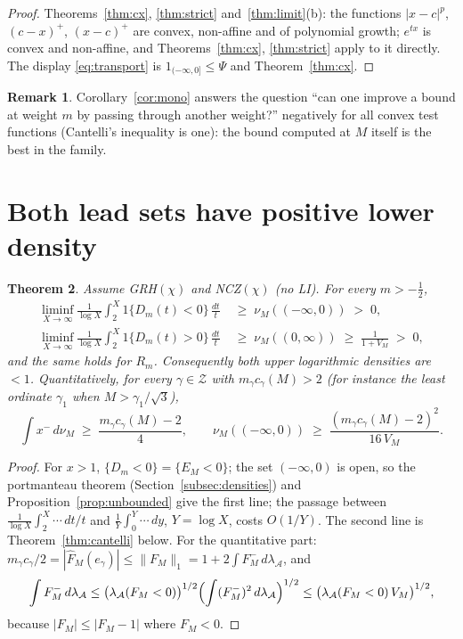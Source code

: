 \documentclass[11pt]{amsart}
\newtheorem{theorem}{Theorem}[section]
\theoremstyle{definition}
\newtheorem{remark}[theorem]{Remark}
\numberwithin{equation}{section}
\newcommand{\cA}{\mathcal A}          %
\newcommand{\cZ}{\mathcal Z}          %
\newcommand{\hA}{\lambda_{\cA}}       %
\begin{document}
\begin{proof}
Theorems~\ref{thm:cx}, \ref{thm:strict} and~\ref{thm:limit}(b): the
functions $|x-c|^p$, $(c-x)^+$, $(x-c)^+$ are convex, non-affine and
of polynomial growth; $e^{tx}$ is convex and non-affine, and
Theorems~\ref{thm:cx}, \ref{thm:strict} apply to it directly. The
display \eqref{eq:transport} is $1_{(-\infty,0]}\le\Psi$ and
Theorem~\ref{thm:cx}.
\end{proof}

\begin{remark}\label{rem:nogain}
Corollary~\ref{cor:mono} answers the question ``can one improve a
bound at weight $m$ by passing through another weight?'' negatively
for all convex test functions (Cantelli's inequality is one): the
bound computed at $M$ itself is the best in the family.
\end{remark}

\section{Both lead sets have positive lower density}
\label{sec:leadsets}

\begin{theorem}\label{thm:leadsets}
Assume GRH$(\chi)$ and NCZ$(\chi)$ (no LI). For every $m>-\tfrac12$,
\begin{align*}
\liminf_{X\to\infty}\frac1{\log X}\int_2^X1\{D_m(t)<0\}\,\frac{dt}t
&\;\ge\;\nu_M((-\infty,0))\;>\;0,\\
\liminf_{X\to\infty}\frac1{\log X}\int_2^X1\{D_m(t)>0\}\,\frac{dt}t
&\;\ge\;\nu_M((0,\infty))\;\ge\;\frac1{1+V_M}\;>\;0,
\end{align*}
and the same holds for $R_m$. Consequently both upper logarithmic
densities are $<1$. Quantitatively, for every $\gamma\in\cZ$ with
$m_\gamma c_\gamma(M)>2$ (for instance the least ordinate $\gamma_1$
when $M>\gamma_1/\sqrt3$),
\[
\int x^-\,d\nu_M\;\ge\;\frac{m_\gamma c_\gamma(M)-2}{4},
\qquad
\nu_M((-\infty,0))\;\ge\;\frac{(m_\gamma c_\gamma(M)-2)^2}{16\,V_M}.
\]
\end{theorem}

\begin{proof}
For $x>1$, $\{D_m<0\}=\{E_M<0\}$; the set $(-\infty,0)$ is open, so
the portmanteau theorem (Section~\ref{subsec:densities}) and
Proposition~\ref{prop:unbounded} give the first line; the passage
between $\frac1{\log X}\int_2^X\cdots\,dt/t$ and
$\frac1Y\int_0^Y\cdots\,dy$, $Y=\log X$, costs $O(1/Y)$. The second
line is Theorem~\ref{thm:cantelli} below. For the quantitative part:
$m_\gamma c_\gamma/2=|\hat F_M(e_\gamma)|\le\|F_M\|_1
=1+2\int F_M^-\,d\hA$, and
\[
\int F_M^-\,d\hA\le\bigl(\hA(F_M<0)\bigr)^{1/2}
\Bigl(\int(F_M^-)^2\,d\hA\Bigr)^{1/2}
\le\bigl(\hA(F_M<0)\,V_M\bigr)^{1/2},
\]
because $|F_M|\le|F_M-1|$ where $F_M<0$.
\end{proof}
\end{document}
